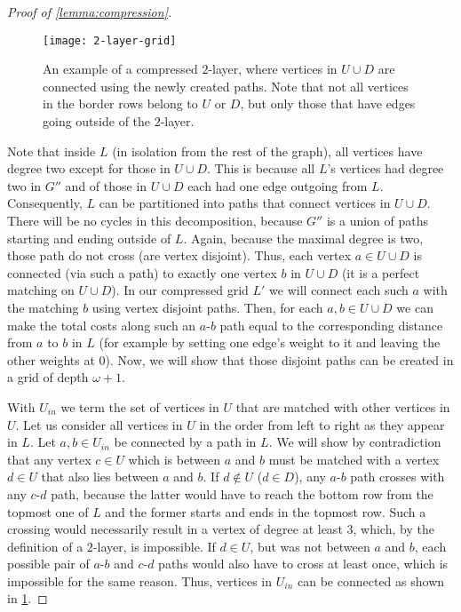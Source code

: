 \begin{proof}[Proof of \cref{lemma:compression}]
    \begin{figure}
        \centering
        \vspace{-0.5cm}
        \texttt{[image: 2-layer-grid]}
        \vspace{-0.5cm}
        \caption{
            An example of a compressed $2$-layer, where vertices in $U \cup D$ are connected using the newly created paths.
            Note that not all vertices in the border rows belong to $U$ or $D$,
            but only those that have edges going outside of the $2$-layer.
        }
        \label{fig:nestedgrid}
    \end{figure}

    Note that inside $L$ (in isolation from the rest of the graph), all vertices have degree two except for those in $U \cup D$.
    This is because all $L$'s vertices had degree two in $G''$ and of those in $U \cup D$ each had one edge outgoing from $L$.
    Consequently, $L$ can be partitioned into paths that connect vertices in $U \cup D$.
    There will be no cycles in this decomposition, because $G''$ is a union of paths starting and ending outside of $L$.
    Again, because the maximal degree is two, those path do not cross (are vertex disjoint).
    Thus, each vertex $a \in U \cup D$ is connected (via such a path) to exactly one vertex $b$ in $U \cup D$
    (it is a perfect matching on $U \cup D$).
    In our compressed grid $L'$ we will connect each such $a$ with the matching $b$ using vertex disjoint paths.
    Then, for each $a, b \in U \cup D$ we can make the total costs along such an $a$-$b$ path equal to
    the corresponding distance from $a$ to $b$ in $L$
    (for example by setting one edge's weight to it and leaving the other weights at $0$).
    Now, we will show that those disjoint paths can be created in a grid of depth $\omega + 1$.
    
    With $U_{in}$ we term the set of vertices in $U$ that are matched with other vertices in $U$.
    Let us consider all vertices in $U$ in the order from left to right as they appear in $L$.
    Let $a, b \in U_{in}$ be connected by a path in $L$.
    We will show by contradiction that any vertex $c \in U$ which is between $a$ and $b$
    must be matched with a vertex $d \in U$ that also lies between $a$ and $b$.
    If $d \notin U$ ($d \in D$), any $a$-$b$ path crosses with any $c$-$d$ path,
    because the latter would have to reach the bottom row from the topmost one of $L$ and the former starts and ends in the topmost row.
    Such a crossing would necessarily result in a vertex of degree at least $3$, which, by the definition of a $2$-layer, is impossible.
    If $d \in U$, but was not between $a$ and $b$, each possible pair of $a$-$b$ and $c$-$d$ paths would also have to cross at least once,
    which is impossible for the same reason.
    Thus, vertices in $U_{in}$ can be connected as shown in \cref{fig:nestedgrid}.


\end{proof}
